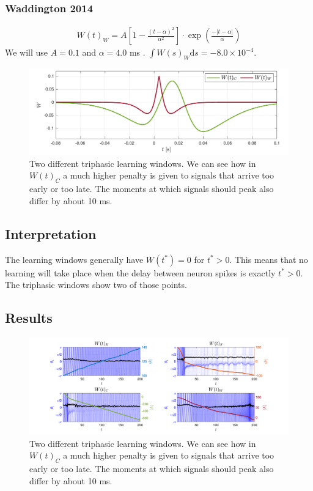 \subsubsection{Waddington 2014}
\begin{align}
W(t)_W =  A \left[1-\frac{\left(t-\alpha\right)^{2}}{\alpha^{2}}\right] \cdot \exp \left(\frac{-\left|t - \alpha\right|}{\alpha}\right) \label{eq:learningwindowWaddington2014}
\end{align}
We will use $A = 0.1$ and $\alpha = 4.0$ ms . $\int W(s)_W \mathrm{d}s = -8.0 \times 10^{-4}$.

\begin{figure}[H]
\centering
\includegraphics[width = \textwidth]{../Figures/LearningWindowsTriphasic.pdf}
\caption{Two different triphasic learning windows. We can see how in $W(t)_C$  a much higher penalty is given to signals that arrive too early or too late. The moments at which signals should peak also differ by about 10 ms.}
\label{fig:LearningWindowsTriphasic}
\end{figure}


\subsection{Interpretation}
The learning windows generally have $W(t^{\ast}) = 0$ for $t^{\ast} > 0$. This means that no learning will take place when the delay between neuron spikes is exactly $t^{\ast} > 0$. The triphasic windows show two of those points.

\subsection{Results}
\begin{figure}[H]
\centering
\includegraphics[width = \textwidth, trim={60 0 60 0}]{../Figures/LearningWithoutScaling.png}
\caption{Two different triphasic learning windows. We can see how in $W(t)_C$  a much higher penalty is given to signals that arrive too early or too late. The moments at which signals should peak also differ by about 10 ms.}
\label{fig:LearningWithoutScaling}
\end{figure}


